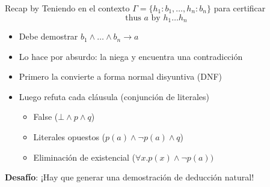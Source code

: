 \documentclass[xcolor={dvipsnames},spanish]{beamer}
\begin{document}
\begin{frame}{Recap by}
    Teniendo en el contexto $\Gamma = \{ h_1 : b_1, \dotso, h_n : b_n\}$
    para certificar
    $$\text{thus } a \text{ by } h_1 \dots h_n$$

    \begin{itemize}
        \item Debe demostrar $b_1 \wedge \dotso \wedge b_n \to a$
        \item Lo hace por absurdo: la niega y encuentra una contradicción
        \item Primero la convierte a forma normal disyuntiva (DNF)
        \item Luego refuta cada cláusula (conjunción de literales)
        \begin{itemize}
            \item False ($\bot \wedge p \wedge q$)
            \item Literales opuestos ($p(a) \wedge \neg p(a) \wedge q$)
            \item Eliminación de existencial ($\forall x. p(x) \wedge \neg p(a))$
        \end{itemize}
    \end{itemize}

    \begin{alertblock}{}
    \textbf{Desafío}: ¡Hay que generar una demostración de deducción natural!
    \end{alertblock}
\end{frame}
\end{document}
